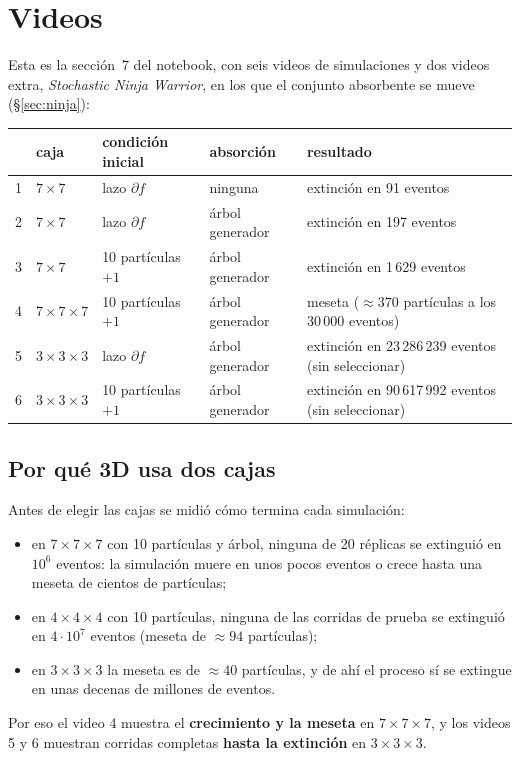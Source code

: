 \documentclass[11pt,a4paper]{article}
\theoremstyle{plain}
\theoremstyle{remark}
\begin{document}
\section{Videos}

Esta es la sección~7 del notebook, con seis videos de simulaciones y dos videos extra, \emph{Stochastic Ninja Warrior}, en los que el conjunto absorbente se mueve (\S\ref{sec:ninja}):

\begin{center}
\small
\begin{tabular}{@{}cllll@{}}
\toprule
 & caja & condición inicial & absorción & resultado \\
\midrule
1 & $7\times7$ & lazo $\partial f$ & ninguna & extinción en 91 eventos \\
2 & $7\times7$ & lazo $\partial f$ & árbol generador & extinción en 197 eventos \\
3 & $7\times7$ & 10 partículas $+1$ & árbol generador & extinción en 1\,629 eventos \\
4 & $7\times7\times7$ & 10 partículas $+1$ & árbol generador & meseta ($\approx370$ partículas a los 30\,000 eventos) \\
5 & $3\times3\times3$ & lazo $\partial f$ & árbol generador & extinción en 23\,286\,239 eventos (sin seleccionar) \\
6 & $3\times3\times3$ & 10 partículas $+1$ & árbol generador & extinción en 90\,617\,992 eventos (sin seleccionar) \\
\bottomrule
\end{tabular}
\end{center}

\subsection{Por qué 3D usa dos cajas}

Antes de elegir las cajas se midió cómo termina cada simulación:
\begin{itemize}[nosep]
  \item en $7\times7\times7$ con 10 partículas y árbol, ninguna de 20 réplicas se extinguió en $10^6$ eventos: la simulación muere en unos pocos eventos o crece hasta una meseta de cientos de partículas;
  \item en $4\times4\times4$ con 10 partículas, ninguna de las corridas de prueba se extinguió en $4\cdot10^7$ eventos (meseta de $\approx94$ partículas);
  \item en $3\times3\times3$ la meseta es de $\approx40$ partículas, y de ahí el proceso sí se extingue en unas decenas de millones de eventos.
\end{itemize}
Por eso el video 4 muestra el \textbf{crecimiento y la meseta} en $7\times7\times7$, y los videos 5 y 6 muestran corridas completas \textbf{hasta la extinción} en $3\times3\times3$.
\end{document}
